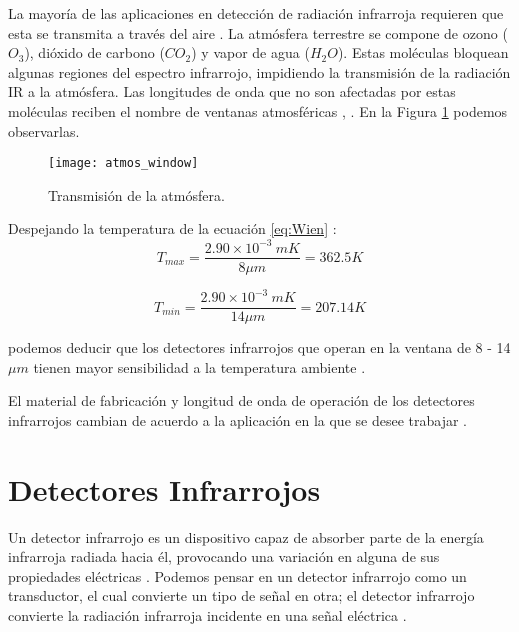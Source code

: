 La mayoría de las aplicaciones en detección de radiación infrarroja requieren que esta se transmita a través del aire \cite{Jimenez}. La atmósfera terrestre se compone de ozono ($O_{3}$), dióxido de carbono ($CO_{2}$) y vapor de agua ($H_{2}O$). Estas moléculas bloquean algunas regiones del espectro infrarrojo, impidiendo la transmisión de la radiación IR a la atmósfera. Las longitudes de onda que no son afectadas por estas moléculas reciben el nombre de ventanas atmosféricas \cite{Rogalski}, \cite{Motilal}. En la Figura \ref{fig:atmos_window} podemos observarlas.

            \begin{figure}[hbtp]
                \centering
                \texttt{[image: atmos\_window]}
                \caption{Transmisión de la atmósfera.}
                \label{fig:atmos_window}
            \end{figure}



Despejando la temperatura de la ecuación \ref{eq:Wien} \cite{BlancoMDA}:
    \begin{equation}
        T_{max} = \frac{2.90\times10^{-3}\ mK}{8\mu m} = 362.5K
        \label{eq:tempmax}
    \end{equation}

    \begin{equation}
        T_{min} = \frac{2.90\times10^{-3}\ mK}{14\mu m} = 207.14K
        \label{eq:tempmin}
    \end{equation}

podemos deducir que los detectores infrarrojos que operan en la ventana de 8 - 14 $\mu m$ tienen mayor sensibilidad a la temperatura ambiente \cite{Rogalski}.

El material de fabricación y longitud de onda de operación de los detectores infrarrojos cambian de acuerdo a la aplicación en la que se desee trabajar \cite{Rogalski}.					           
     
    
    \section{Detectores Infrarrojos}
    
    Un detector infrarrojo es un dispositivo capaz de absorber parte de la energía infrarroja radiada hacia él, provocando una variación en alguna de sus propiedades eléctricas \cite{BlancoMDA}. Podemos pensar en un detector infrarrojo como un transductor, el cual convierte un tipo de señal en otra; el detector infrarrojo convierte la radiación infrarroja incidente en una señal eléctrica \cite{Vincent}.
    
